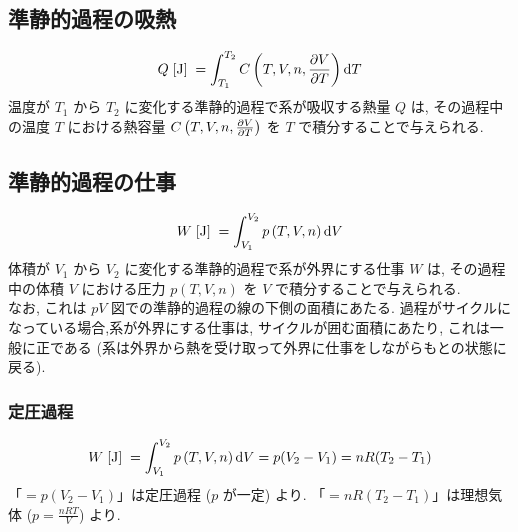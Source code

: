 \documentclass[a4paper,11pt]{jsarticle}
\newcommand{\braunit}[1]{\;\text{[}\unit[per-mode = symbol]{#1}\text{]}\;}
\begin{document}

\subsection{準静的過程の吸熱} \label{section:準静的過程の吸熱}
\begin{align*}
  Q\braunit{\J} = \int_{T_1}^{T_2} C\left(T, V, n, \pdv{V}{T}\right)\dd{T}
\end{align*}
温度が $T_1$ から $T_2$ に変化する準静的過程で系が吸収する熱量 $Q$ は,
その過程中の温度 $T$ における熱容量 $C\left(T, V, n, \pdv{V}{T}\right)$ を $T$ で積分することで与えられる.
\cite[pp.44]{thermo}

\subsection{準静的過程の仕事}
\begin{align*}
  W\braunit{\J} = \int_{V_1}^{V_2} p\left(T, V, n\right)\dd{V}
\end{align*}
体積が $V_1$ から $V_2$ に変化する準静的過程で系が外界にする仕事 $W$ は,
その過程中の体積 $V$ における圧力 $p\left(T, V, n\right)$ を $V$ で積分することで与えられる.\\
なお, これは $pV$ 図での準静的過程の線の下側の面積にあたる.
過程がサイクルになっている場合,系が外界にする仕事は, サイクルが囲む面積にあたり, これは一般に正である
(系は外界から熱を受け取って外界に仕事をしながらもとの状態に戻る).
\cite[pp.48]{thermo}
\subsubsection{定圧過程}
\begin{align*}
  W\braunit{\J} = \int_{V_1}^{V_2} p\left(T, V, n\right)\dd{V} = p(V_2 - V_1) = nR(T_2 - T_1)
\end{align*}
「$= p(V_2 - V_1)$」は定圧過程 ($p$ が一定) より. 「$= nR(T_2 - T_1)$」は理想気体 ($p = \frac{nRT}{V}$) より.
\cite[pp.48]{thermo}
\end{document}
